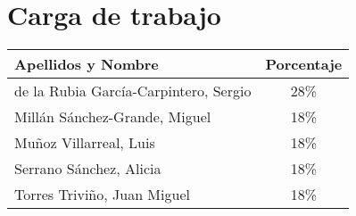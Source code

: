 \documentclass[11pt,a4paper,spanish,twoside]{book}
\begin{document}
\chapter{Carga de trabajo}
\begin{center}
  \begin{tabular}{p{10cm}|c}
    \textbf{Apellidos y Nombre} & \textbf{Porcentaje} \\ \hline \hline
    de la Rubia García-Carpintero, Sergio & 28\% \\
    Millán Sánchez-Grande, Miguel         & 18\% \\ 
    Muñoz Villarreal, Luis                & 18\% \\ 
    Serrano Sánchez, Alicia               & 18\% \\ 
    Torres Triviño, Juan Miguel           & 18\% \\
  \end{tabular}
\end{center}

 

\end{document}
